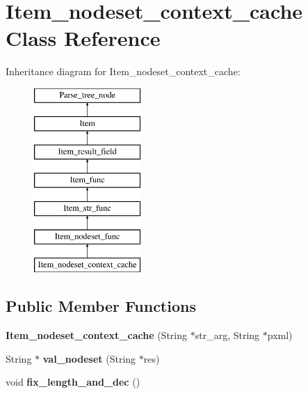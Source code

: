 \hypertarget{classItem__nodeset__context__cache}{}\section{Item\+\_\+nodeset\+\_\+context\+\_\+cache Class Reference}
\label{classItem__nodeset__context__cache}
Inheritance diagram for Item\+\_\+nodeset\+\_\+context\+\_\+cache\+:\begin{figure}[H]
\begin{center}
\leavevmode
\includegraphics[height=7.000000cm]{classItem__nodeset__context__cache}
\end{center}
\end{figure}
\subsection*{Public Member Functions}
\begin{DoxyCompactItemize}
\item 
\mbox{\label{classItem__nodeset__context__cache_a9245b4756d0030351735cb2f365388b7}} 
{\bfseries Item\+\_\+nodeset\+\_\+context\+\_\+cache} (String $\ast$str\+\_\+arg, String $\ast$pxml)
\item 
\mbox{\label{classItem__nodeset__context__cache_a18b6a24e9b7c3a783e897c1857e9f751}} 
String $\ast$ {\bfseries val\+\_\+nodeset} (String $\ast$res)
\item 
\mbox{\label{classItem__nodeset__context__cache_a4368be9f41cb16b58d4afec01bcd8fc2}} 
void {\bfseries fix\+\_\+length\+\_\+and\+\_\+dec} ()
\end{DoxyCompactItemize}
